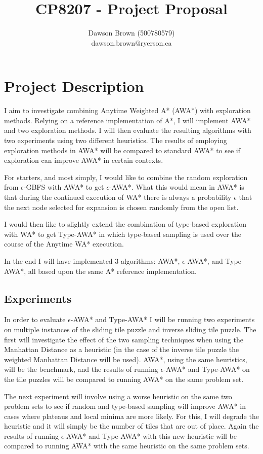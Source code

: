 \documentclass{llncs}
\title{CP8207 - Project Proposal}
\author{Dawson Brown (500780579)\\dawson.brown@ryerson.ca}
\institute{Ryerson University}
\date{}
\begin{document}
\maketitle
\pagestyle{plain}

\section{Project Description}
I aim to investigate combining Anytime Weighted A* (AWA*) \cite{hansen2007anytime} with exploration methods. Relying on a reference implementation of A*, I will implement AWA* and two exploration methods. I will then evaluate the resulting algorithms with two experiments using two different heuristics. The results of employing exploration methods in AWA* will be compared to standard AWA* to see if exploration can improve AWA* in certain contexts.

For starters, and most simply, I would like to combine the random exploration from $\epsilon$-GBFS \cite{valenzano2014comparison} with AWA* to get $\epsilon$-AWA*. What this would mean in AWA* is that during the continued execution of WA* there is always a probability $\epsilon$ that the next node selected for expansion is chosen randomly from the open list. 

I would then like to slightly extend the combination of type-based exploration with WA* \cite{cohen2021type} to get Type-AWA* in which type-based sampling is used over the course of the Anytime WA* execution. 

In the end I will have implemented 3 algorithms: AWA*, $\epsilon$-AWA*, and Type-AWA*, all based upon the same A* reference implementation.

\subsection{Experiments}
In order to evaluate $\epsilon$-AWA* and Type-AWA* I will be running two experiments on multiple instances of the sliding tile puzzle and inverse sliding tile puzzle. The first will investigate the effect of the two sampling techniques when using the Manhattan Distance as a heuristic (in the case of the inverse tile puzzle the weighted Manhattan Distance will be used). AWA*, using the same heuristics, will be the benchmark, and the results of running $\epsilon$-AWA* and Type-AWA* on the tile puzzles will be compared to running AWA* on the same problem set. 

The next experiment will involve using a worse heuristic on the same two problem sets to see if random and type-based sampling will improve AWA* in cases where plateaus and local minima are more likely. For this, I will degrade the heuristic and it will simply be the number of tiles that are out of place. Again the results of running $\epsilon$-AWA* and Type-AWA* with this new heuristic will be compared to running AWA* with the same heuristic on the same problem sets.
\end{document}
